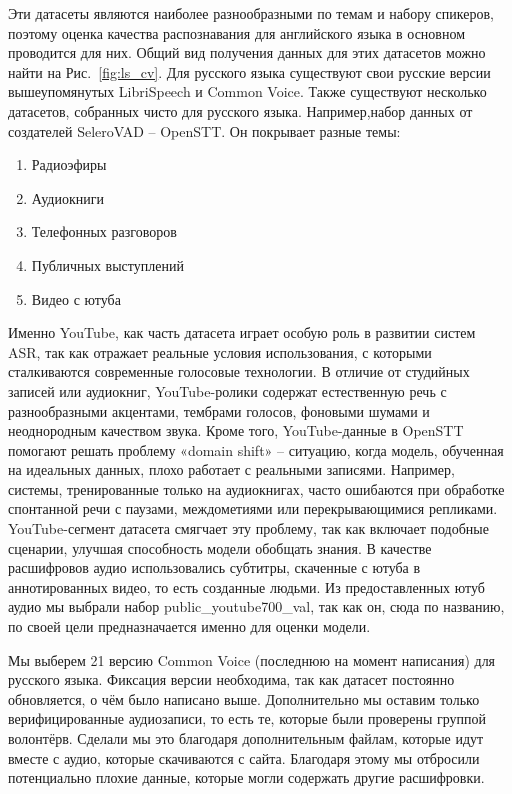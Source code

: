 Эти датасеты являются наиболее разнообразными по темам и набору спикеров, поэтому оценка качества распознавания для английского языка в основном проводится для них.
Общий вид получения данных для этих датасетов можно найти на Рис.~\ref{fig:ls_cv}.
Для русского языка существуют свои русские версии вышеупомянутых LibriSpeech и Common Voice.
Также существуют несколько датасетов, собранных чисто для русского языка. 
Например,набор данных от создателей SeleroVAD -- OpenSTT\cite{andrusenko2020exploration}. 
Он покрывает разные темы: 
\begin{enumerate}
  \item Радиоэфиры
  \item Аудиокниги
  \item Телефонных разговоров
  \item Публичных выступлений
  \item Видео с ютуба
\end{enumerate}
Именно YouTube, как часть датасета играет особую роль в развитии систем ASR, так как отражает реальные условия использования, с которыми сталкиваются современные голосовые технологии.
В отличие от студийных записей или аудиокниг, YouTube-ролики содержат естественную речь с разнообразными акцентами, тембрами голосов, фоновыми шумами и неоднородным качеством звука. 
Кроме того, YouTube-данные в OpenSTT помогают решать проблему «domain shift» -- ситуацию, когда модель, обученная на идеальных данных, плохо работает с реальными записями.
Например, системы, тренированные только на аудиокнигах, часто ошибаются при обработке спонтанной речи с паузами, междометиями или перекрывающимися репликами.
YouTube-сегмент датасета смягчает эту проблему, так как включает подобные сценарии, улучшая способность модели обобщать знания.
В качестве расшифровов аудио использовались субтитры, скаченные с ютуба в аннотированных видео, то есть созданные людьми.
Из предоставленных ютуб аудио мы выбрали набор public\_youtube700\_val, так как он, сюда по названию, по своей цели предназначается именно для оценки модели.

Мы выберем 21 версию Common Voice (последнюю на момент написания) для русского языка.
Фиксация версии необходима, так как датасет постоянно обновляется, о чём было написано выше.
Дополнительно мы оставим только верифицированные аудиозаписи, то есть те, которые были проверены группой волонтёрв.
Сделали мы это благодаря дополнительным файлам, которые идут вместе с аудио, которые скачиваются с сайта.
Благодаря этому мы отбросили потенциально плохие данные, которые могли содержать другие расшифровки.

